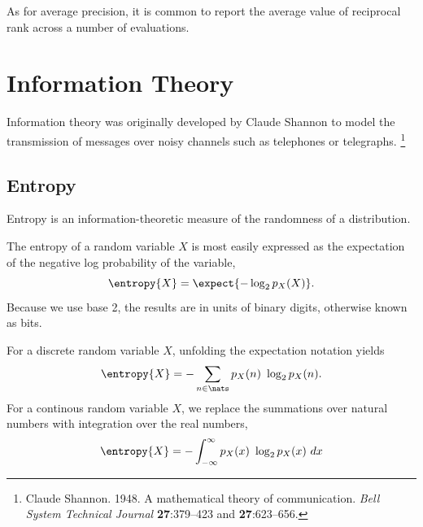 As for average precision, it is common to report the average
value of reciprocal rank across a number of evaluations.  


\section{Information Theory}\label{section:stats-information-theory}

Information theory was originally developed by Claude Shannon to model
the transmission of messages over noisy channels such as telephones
or telegraphs.%
%
\footnote{Claude Shannon. 1948.  A mathematical theory of
  communication.  {\it Bell System Technical Journal} {\bf
    27}:379--423 and {\bf 27}:623--656.}

\subsection{Entropy}\label{section:stats-entropy}

Entropy is an information-theoretic measure of the randomness of a
distribution.  


The entropy of a random variable $X$ is most easily expressed as the
expectation of the negative log probability of the variable,
%
\begin{equation}
\entropy{X} = \expect{- \log_2 p_X(X)}.
\end{equation}
%
Because we use base 2, the results are in units of binary digits,
otherwise known as bits.

For a discrete random variable $X$, unfolding the expectation notation
yields
%
\begin{equation}
\entropy{X} = - \sum_{n \in \nats} p_X(n) \ \log_2 p_X(n).
\end{equation}
%
For a continous random variable $X$, we replace the summations
over natural numbers with integration over the real numbers,
%
\begin{equation}
\entropy{X} = - \int_{-\infty}^{\infty} p_X(x) \ \log_2 p_X(x) \ dx
\end{equation}

